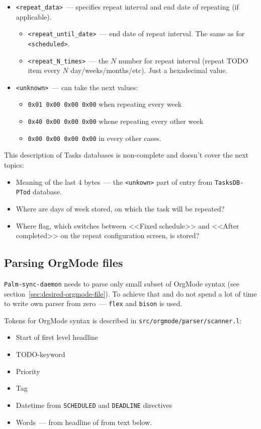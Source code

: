 \documentclass[a4paper,12pt,oneside]{scrartcl}
\begin{document}
\begin{itemize}
\begin{itemize}
  \item \texttt{<repeat\_data>}~--- specifies repeat interval and end date of
    repeating (if applicable).
    \begin{itemize}
    \item \texttt{<repeat\_until\_date>}~--- end date of repeat interval. The
      same as for \texttt{<scheduled>}.
    \item \texttt{<repeat\_N\_times>}~--- the $N$ number for repeat interval
      (repeat TODO item every $N$ day/weeks/months/etc). Just a hexadecimal
      value.
    \end{itemize}

  \item \texttt{<unknown>}~--- can take the next values:
    \begin{itemize}
    \item \texttt{0x01 0x00 0x00 0x00} when repeating every week
    \item \texttt{0x40 0x00 0x00 0x00} whene repeating every other week
    \item \texttt{0x00 0x00 0x00 0x00} in every other cases.
    \end{itemize}
  \end{itemize}
\end{itemize}

This description of Tasks databases is non-complete and doesn't cover the next
topics:
\begin{itemize}
\item Meaning of the last 4 bytes~--- the \texttt{<unkown>} part of entry from
  \texttt{TasksDB-PTod} database.
\item Where are days of week stored, on which the task will be repeated?
\item Where flag, which switches between <<Fixed schedule>> and <<After
  completed>> on the repeat configuration screen, is stored?
\end{itemize}

\subsection{Parsing OrgMode files}
\label{sec:pars-orgm-files}

\texttt{Palm-sync-daemon} needs to parse only small subset of OrgMode syntax
(see section~\ref{sec:desired-orgmode-file}). To achieve that and do not spend a
lot of time to write own parser from zero~--- \texttt{flex} and \texttt{bison}
is used.

Tokens for OrgMode syntax is described in \texttt{src/orgmode/parser/scanner.l}:
\begin{itemize}
\item Start of first level headline
\item TODO-keyword
\item Priority
\item Tag
\item Datetime from \texttt{SCHEDULED} and \texttt{DEADLINE} directives
\item Words~--- from headline of from text below.
\end{itemize}
\end{document}
